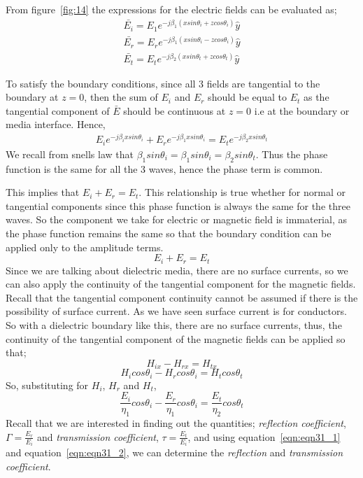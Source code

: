 From figure~\ref{fig:14} the expressions for the electric fields can be evaluated as;
\begin{align*}
\bar{E_{i}} = E_{1} e^{-j\beta_{1} (x sin\theta_{i} + z cos\theta_{i})} \hat{y}\\
\bar{E_{r}} = E_{r} e^{-j\beta_{1} (x sin\theta_{i} - z cos\theta_{i})} \hat{y}\\
\bar{E_{t}} = E_{t} e^{-j\beta_{2} (x sin\theta_{t} + z cos\theta_{t})} \hat{y}
\end{align*}

To satisfy the boundary conditions, since all 3 fields are tangential to the boundary at $z=0$, then the sum of $E_i$ and $E_r$ should be equal to $E_{t}$ as the tangential component of $\bar{E}$ should be continuous at $z=0$ i.e at the boundary or media interface.
Hence,
\begin{align*}
E_{i} e^{-j \beta_{i} x sin\theta_{i}} + E_{r} e^{-j \beta_{1} x sin\theta_{i}} = E_{t} e^{-j \beta_{2} x sin\theta_{t}}
\end{align*}
We recall from snells law that $\beta_{1} sin\theta_{i} = \beta_{1} sin\theta_{i} = \beta_{2} sin\theta_{t}$. Thus the phase function is the same for all the 3 waves, hence the phase term is common.

This implies that $ E_{i} + E_{r} = E_{t}$. This relationship is true whether for normal or tangential components since this phase function is always the same for the three waves. So the component we take for electric or magnetic field is immaterial, as the phase function remains the same so that the boundary condition can be applied only to the amplitude terms. 
\begin{equation}
E_{i} + E_{r} = E_{t}
\label{eqn:eqn31_1}
\end{equation}
Since we are talking about dielectric media, there are no surface currents, so we can also apply the continuity of the tangential component for the magnetic fields. Recall that the tangential component continuity cannot be assumed if there is the possibility of surface current. As we have seen surface current is for conductors. So with a dielectric boundary like this, there are no surface currents, thus, the continuity of the tangential component of the magnetic fields can be applied so that; 
\begin{equation*}
H_{ix} - H_{rx} = H_{tx}
\end{equation*}
\begin{equation*}
H_{i} cos\theta_{i} - H_{r} cos\theta_{i} = H_{t} cos\theta_{t}
\end{equation*}
So, substituting for $H_{i}$, $H_{r}$ and $H_{t}$,
\begin{equation}
\frac{E_{i}}{\eta_{1}} cos\theta_{i} - \frac{E_{r}}{\eta_{1}} cos\theta_{i} = \frac{E_{t}}{\eta_{2}} cos\theta_{t}
\label{eqn:eqn31_2}
\end{equation}
Recall that we are interested in finding out the quantities; \emph{reflection coefficient}, $\Gamma = \frac{E_{r}}{E_{i}}$ and \emph{transmission coefficient}, $ \tau = \frac{E_{t}}{E_{i}}$, and using equation~\ref{eqn:eqn31_1} and equation~\ref{eqn:eqn31_2}, we can determine the \emph{reflection} and \emph{transmission coefficient}.

